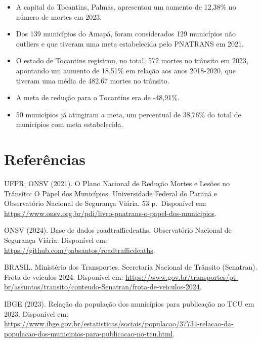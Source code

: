 \documentclass[
  letterpaper,
  DIV=11,
  numbers=noendperiod]{scrreprt}
\newlength{\cslhangindent}
\newenvironment{CSLReferences}[2] %
 {\begin{list}{}{%
  \setlength{\itemindent}{0pt}
  \setlength{\leftmargin}{0pt}
  \setlength{\parsep}{0pt}
  \ifodd #1
   \setlength{\leftmargin}{\cslhangindent}
   \setlength{\itemindent}{-1\cslhangindent}
  \fi
  \setlength{\itemsep}{#2\baselineskip}}}
 {\end{list}}
\begin{document}
\begin{itemize}
\item
  A capital do Tocantins, Palmas, apresentou um aumento de 12,38\% no
  número de mortes em 2023.
\item
  Dos 139 municípios do Amapá, foram considerados 129 municípios não
  outliers e que tiveram uma meta estabelecida pelo PNATRANS em 2021.
\item
  O estado de Tocantins registrou, no total, 572 mortes no trânsito em
  2023, apontando um aumento de 18,51\% em relação aos anos 2018-2020,
  que tiveram uma média de 482,67 mortes no trânsito.
\item
  A meta de redução para o Tocantins era de -48,91\%.
\item
  50 municípios já atingiram a meta, um percentual de 38,76\% do total
  de municípios com meta estabelecida.
\end{itemize}


\chapter*{Referências}\label{referuxeancias}


\label{refs}
\begin{CSLReferences}{0}{1}
UFPR; ONSV (2021). O Plano Nacional de Redução Mortes e Lesões no
Trânsito: O Papel dos Municípios. Universidade Federal do Paraná e
Observatório Nacional de Segurança Viária. 53 p.~Disponível em:
\url{https://www.onsv.org.br/pdi/livro-pnatrans-o-papel-dos-municipios}.

ONSV (2024). Base de dados roadtrafficdeaths. Observatório Nacional de
Segurança Viária. Disponível em:
\url{https://github.com/pabsantos/roadtrafficdeaths}.

BRASIL. Ministério dos Transportes. Secretaria Nacional de Trânsito
(Senatran). Frota de veículos 2024. Disponível em:
\url{https://www.gov.br/transportes/pt-br/assuntos/transito/conteudo-Senatran/frota-de-veiculos-2024}.

IBGE (2023). Relação da população dos municípios para publicação no TCU
em 2023. Disponível em:
\url{https://www.ibge.gov.br/estatisticas/sociais/populacao/37734-relacao-da-populacao-dos-municipios-para-publicacao-no-tcu.html}.

\end{CSLReferences}
\end{document}
